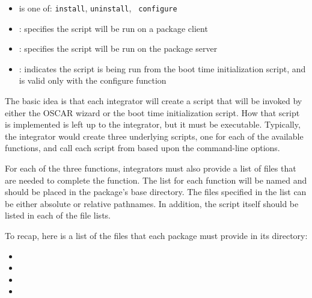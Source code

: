 
\begin{itemize}
\item {} is one of: {\tt install}, {\tt uninstall}, {\tt
    configure}

\item {}: specifies the script will be run on a package client
  
\item {}: specifies the script will be run on the package server
  
\item {}: indicates the script is being run from the boot
  time initialization script, and is valid only with the configure
  function
\end{itemize}

The basic idea is that each integrator will create a
 script that will be invoked by either the OSCAR
wizard or the boot time initialization script. How that script is
implemented is left up to the integrator, but it must be executable. 
Typically, the integrator would create three underlying scripts, one 
for each of the available functions, and call each script from 
 based upon the command-line options.

For each of the three functions, integrators must also provide a list
of files that are needed to complete the function. The list for each
function will be named  and should be
placed in the package's base directory. The files specified in the
list can be either absolute or relative pathnames. In addition, the
 script itself should be listed in each of the file lists.

To recap, here is a list of the files that each package must provide
in its directory:

\begin{itemize}
\item {}
\item {}
\item {}
\item {}
\end{itemize}

